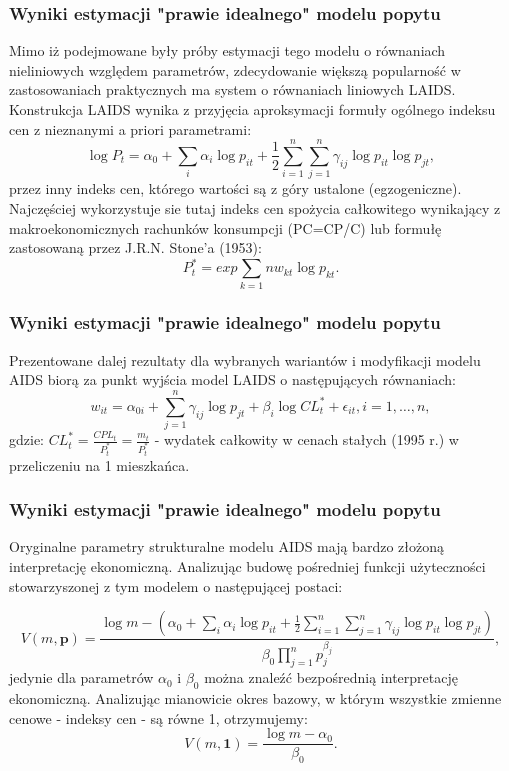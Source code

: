 \documentclass[11pt,usenames,dvipsnames,svgnames,x11names]{beamer}\usepackage[]{graphicx}\usepackage[]{color}
\theoremstyle{definition}
\theoremstyle{remark}
\begin{document}
\begin{frame}
\frametitle{Wyniki estymacji "prawie idealnego" modelu popytu }
Mimo iż podejmowane były próby estymacji tego modelu o równaniach nieliniowych  względem parametrów, zdecydowanie większą popularność w zastosowaniach praktycznych ma system o równaniach liniowych LAIDS. Konstrukcja LAIDS wynika z przyjęcia aproksymacji formuły ogólnego indeksu cen z nieznanymi a priori parametrami:
$$ \log P_{t} = \alpha_{0} + \sum\limits_{i} \alpha_{i} \log p_{it} + \frac{1}{2} \sum\limits_{i=1}^{n} \sum\limits_{j=1}^{n} \gamma_{ij} \log p_{it} \log p_{jt}, $$
przez inny indeks cen, którego wartości są z góry ustalone (egzogeniczne). Najczęściej wykorzystuje sie tutaj indeks cen spożycia całkowitego wynikający z makroekonomicznych rachunków konsumpcji (PC=CP/C) lub formułę zastosowaną przez J.R.N. Stone'a (1953):
$$ P_{t}^{*} = exp{\sum\limits_{k=1}{n} w_{kt} \log p_{kt}}. $$
\end{frame}

\begin{frame}
\frametitle{Wyniki estymacji "prawie idealnego" modelu popytu }
Prezentowane dalej rezultaty dla wybranych wariantów i modyfikacji modelu AIDS biorą za punkt wyjścia model LAIDS o następujących równaniach:
$$ w_{it} = \alpha_{0i} + \sum\limits_{j=1}^{n} \gamma_{ij} \log p_{jt} + \beta_{i} \log CL_{t}^{*} + \epsilon_{it}, i=1, \ldots, n, $$
gdzie: $CL_{t}^{*} = \frac{CPL_{t}}{P_{t}^{*}} = \frac{m_{t}}{P_{t}^{*}}$ - wydatek całkowity w cenach stałych (1995 r.) w przeliczeniu na 1 mieszkańca.
\end{frame}


\begin{frame}
\frametitle{Wyniki estymacji "prawie idealnego" modelu popytu }
Oryginalne parametry strukturalne modelu AIDS mają bardzo złożoną interpretację ekonomiczną. Analizując budowę pośredniej funkcji użyteczności stowarzyszonej z tym modelem o następującej postaci:

$$ V(m, \textbf{p}) = \frac{ \log m - (\alpha_{0} +  \sum\limits_{i} \alpha_{i} \log p_{it} + \frac{1}{2} \sum\limits_{i=1}^{n} \sum\limits_{j=1}^{n} \gamma_{ij} \log p_{it} \log p_{jt} )}{ \beta_{0} \prod\limits_{j=1}^{n} p_{j}^{\beta_{j}}} ,$$
jedynie dla parametrów $\alpha_{0}$ i $\beta_{0}$ można znaleźć bezpośrednią interpretację ekonomiczną. Analizując mianowicie okres bazowy, w którym wszystkie zmienne cenowe - indeksy cen - są równe 1, otrzymujemy:
$$ V(m, \textbf{1}) = \frac{\log m - \alpha_{0}}{\beta_{0}}. $$
\end{frame}
\end{document}
